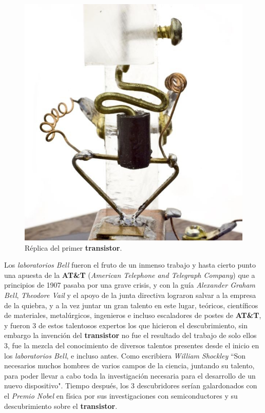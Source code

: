 \begin{figure}[htb]
	\centering
	\includegraphics[scale = 0.2]{Graphics/first_transistor_replica.jpg}
	\caption{Réplica del primer \textbf{transistor}.}
	\label{fig:3}
\end{figure}

Los \emph{laboratorios Bell} fueron el fruto de un inmenso trabajo y hasta cierto punto una apuesta de la \textbf{AT\&T}
(\emph{American Telephone and Telegraph Company}) que a principios de 1907 pasaba por una grave crisis, y con la guía
\emph{Alexander Graham Bell}, \emph{Theodore Vail} y el apoyo de la junta directiva lograron salvar a la empresa de la quiebra,
y a la vez juntar un gran talento en este lugar, teóricos, científicos de materiales, metalúrgicos, ingenieros e incluso escaladores
de postes de \textbf{AT\&T}, y fueron 3 de estos talentosos expertos los que hicieron el descubrimiento, sin embargo la invención del
\textbf{transistor} no fue el resultado del trabajo de solo ellos 3, fue la mezcla del conocimiento de diversos talentos presentes
desde el inicio en los \emph{laboratorios Bell}, e incluso antes. Como escribiera \emph{William Shockley} “Son necesarios muchos hombres
de varios campos de la ciencia, juntando su talento, para poder llevar a cabo toda la investigación necesaria para el desarrollo de un
nuevo dispositivo". Tiempo después, los 3 descubridores serían galardonados con el \emph{Premio Nobel} en física por sus investigaciones con 
semiconductores y su descubrimiento sobre el \textbf{transistor}. \\


